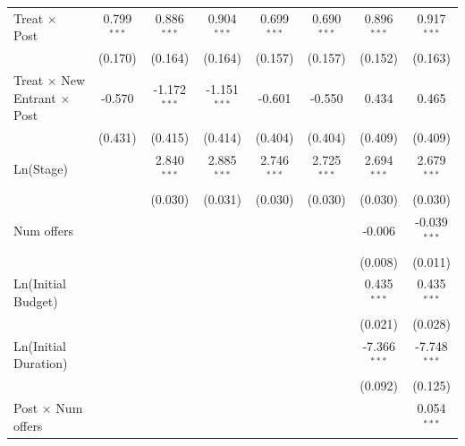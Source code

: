 \documentclass[
]{article}
\begin{document}
\begin{tabular}{lccccccc}
   Treat $\times$ Post                        & 0.799$^{***}$  & 0.886$^{***}$  & 0.904$^{***}$  & 0.699$^{***}$  & 0.690$^{***}$  & 0.896$^{***}$  & 0.917$^{***}$\\   
                                              & (0.170)        & (0.164)        & (0.164)        & (0.157)        & (0.157)        & (0.152)        & (0.163)\\   
   Treat $\times$ New Entrant $\times$ Post   & -0.570         & -1.172$^{***}$ & -1.151$^{***}$ & -0.601         & -0.550         & 0.434          & 0.465\\   
                                              & (0.431)        & (0.415)        & (0.414)        & (0.404)        & (0.404)        & (0.409)        & (0.409)\\   
   Ln(Stage)                                  &                & 2.840$^{***}$  & 2.885$^{***}$  & 2.746$^{***}$  & 2.725$^{***}$  & 2.694$^{***}$  & 2.679$^{***}$\\   
                                              &                & (0.030)        & (0.031)        & (0.030)        & (0.030)        & (0.030)        & (0.030)\\   
   Num offers                                 &                &                &                &                &                & -0.006         & -0.039$^{***}$\\   
                                              &                &                &                &                &                & (0.008)        & (0.011)\\   
   Ln(Initial Budget)                         &                &                &                &                &                & 0.435$^{***}$  & 0.435$^{***}$\\   
                                              &                &                &                &                &                & (0.021)        & (0.028)\\   
   Ln(Initial Duration)                       &                &                &                &                &                & -7.366$^{***}$ & -7.748$^{***}$\\   
                                              &                &                &                &                &                & (0.092)        & (0.125)\\   
   Post $\times$ Num offers                   &                &                &                &                &                &                & 0.054$^{***}$\\   

\end{tabular}
\end{document}
